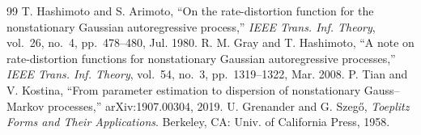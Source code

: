 \documentclass[11pt,onecolumn]{IEEEtran}
\begin{document}
\begin{thebibliography}{99}
 T. Hashimoto and S. Arimoto, ``On the
rate-distortion function for the nonstationary Gaussian autoregressive
process,'' \emph{IEEE Trans. Inf. Theory}, vol.~26, no.~4,
pp.~478--480, Jul. 1980.
 R. M. Gray and T. Hashimoto, ``A note on
rate-distortion functions for nonstationary Gaussian autoregressive
processes,'' \emph{IEEE Trans. Inf. Theory}, vol.~54, no.~3,
pp.~1319--1322, Mar. 2008.
 P. Tian and V. Kostina, ``From parameter estimation
to dispersion of nonstationary Gauss--Markov processes,''
arXiv:1907.00304, 2019.
 U. Grenander and G. Szeg\H{o}, \emph{Toeplitz
Forms and Their Applications}. Berkeley, CA: Univ. of California Press,
1958.
\end{thebibliography}
\end{document}
